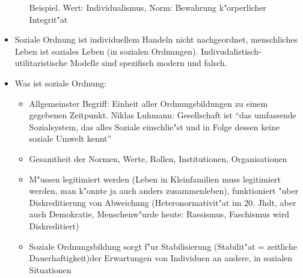 \begin{itemize}
\begin{itemize}
				Beispiel. Wert: Individualismus, Norm: Bewahrung k"orperlicher Integrit"at
		\end{itemize}
	\item
		Soziale Ordnung ist individuellem Handeln nicht nachgeordnet, menschliches Leben ist soziales Leben (in sozialen Ordnungen). Indivudalistisch-utilitaristische Modelle sind spezifisch modern und falsch.
	\item
		Was ist soziale Ordnung:
		\begin{itemize}
			\item
				Allgemeinster Begriff: Einheit aller Ordnungsbildungen zu einem gegebenen Zeitpunkt. Niklas Luhmann: Gesellschaft ist \enquote{das umfassende Sozialsystem, das alles Soziale einschlie"st und in Folge dessen keine soziale Umwelt kennt}
			\item
				Gesamtheit der Normen, Werte, Rollen, Institutionen, Organisationen
			\item
				M"ussen legitimiert werden (Leben in Kleinfamilien muss legitimiert werden, man k"onnte ja auch anders zusammenleben), funktioniert "uber Diskreditierung von Abweichung (Heteronormativit"at im 20. Jhdt, aber auch Demokratie, Menschenw"urde heute: Rassismus, Faschismus wird Diskreditiert)
			\item
				Soziale Ordnungsbildung sorgt f"ur Stabilisierung (Stabilit"at = zeitliche Dauerhaftigkeit)der Erwartungen von Individuen an andere, in sozialen Situationen
		\end{itemize}


\end{itemize}
